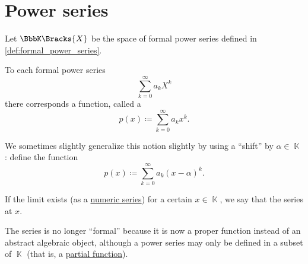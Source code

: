 \section{Power series}\label{sec:power_series}

\begin{definition}\label{def:convergent_power_series}
  Let \( \BbbK\Bracks{X} \) be the space of formal power series defined in \cref{def:formal_power_series}.

  To each formal power series
  \begin{equation*}
    \sum_{k=0}^\infty a_k X^k
  \end{equation*}
  there corresponds a function, called a 
  \begin{equation}\label{def:convergent_power_series/series}
    p(x) \coloneqq \sum_{k=0}^\infty a_k x^k.
  \end{equation}

  We sometimes slightly generalize this notion slightly by using a \enquote{shift} by \( \alpha \in \BbbK \): define the function
  \begin{equation}\label{def:convergent_power_series/shifted_series}
    p(x) \coloneqq \sum_{k=0}^\infty a_k (x - \alpha)^k.
  \end{equation}

  If the limit exists (as a \hyperref[def:convergent_series]{numeric series}) for a certain \( x \in \BbbK \), we say that the series  at \( x \).

  The series is no longer \enquote{formal} because it is now a proper function instead of an abstract algebraic object, although a power series may only be defined in a subset of \( \BbbK \) (that is, a \hyperref[def:set_valued_map/partial]{partial function}).
\end{definition}

